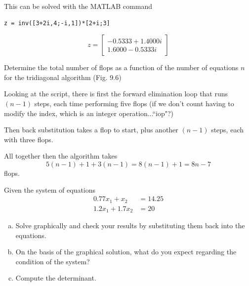 \documentclass{article}
\begin{document}
This can be solved with the MATLAB command
\begin{lstlisting}
z = inv([3+2i,4;-i,1])*[2+i;3]
\end{lstlisting}
\[z =  
\begin{bmatrix}
-0.5333 + 1.4000i\\
1.6000 - 0.5333i
\end{bmatrix}
\]

\setcounter{problem}{0}
\begin{problem}
Determine the total number of flops as a function of the number of equations $n$ for the tridiagonal algorithm (Fig. 9.6)
\end{problem}

Looking at the script, there is first the forward elimination loop that runs $(n-1)$ steps, each time performing five flops (if we don't count having to modify the index, which is an integer operation...``iop"?)

Then back substitution takes a flop to start, plus another $(n-1)$ steps, each with three flops.

All together then the algorithm takes 
\[ 5(n-1) + 1 + 3(n-1) = 8(n-1) + 1 = \boxed{8n - 7} \]
flops.

\setcounter{problem}{3}
\begin{problem}
Given the system of equations
\begin{align*}
0.77x_{1} + x_{2} &= 14.25\\
1.2x_{1} + 1.7x_{2} &= 20
\end{align*}
\begin{enumerate}[(a)]
\item Solve graphically and check your results by substituting them back into the equations.
\item On the basis of the graphical solution, what do you expect regarding the condition of the system?
\item Compute the determinant.
\end{enumerate}
\end{problem}
\end{document}
